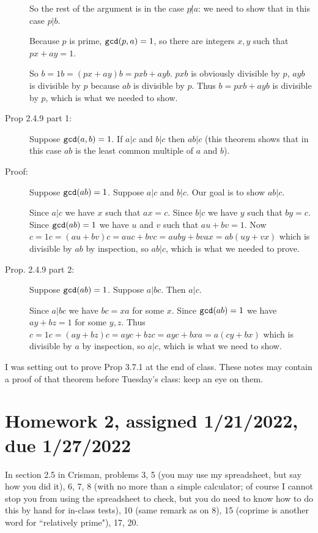 \documentclass[12pt]{article}
\begin{document}
\begin{description}
So the rest of the argument is in the case $p\not|a$:  we need to show that in this case $p|b$.

Because $p$ is prime, ${\tt gcd}(p,a)=1$, so there are integers $x,y$ such that $px+ay=1$.

So $b=1b=(px+ay)b = pxb + ayb$.  $pxb$ is obviously divisible by $p$,  $ayb$ is divisible by $p$ because $ab$ is divisible by $p$.
Thus $b=pxb +ayb$ is divisible by $p$, which is what we needed to show.

\item[Prop 2.4.9 part 1:]  Suppose ${\tt gcd}(a,b) = 1$.  If $a|c$ and $b|c$ then $ab|c$ (this theorem shows that in this case $ab$ is the least common multiple of $a$ and $b$).

\item[Proof:]  Suppose ${\tt gcd}(ab) = 1$.  Suppose $a|c$ and $b|c$.  Our goal is to show $ab|c$.

Since $a|c$ we have $x$ such that $ax=c$.  Since $b|c$ we have $y$ such that $by=c$.  Since ${\tt gcd}(ab) = 1$ we have $u$ and $v$ such that $au+bv=1$.  Now $c=1c=(au+bv)c=auc + bvc= auby + bvax = ab(uy+vx)$ which is divisible by $ab$ by inspection, so $ab|c$, which is what we needed to prove.

\item[Prop. 2.4.9 part 2:]  Suppose ${\tt gcd}(ab) = 1$.  Suppose $a|bc$.  Then $a|c$.

Since $a|bc$ we have $bc=xa$ for some $x$.  Since ${\tt gcd}(ab) = 1$ we have $ay+bz=1$ for some $y,z$.  Thus $c=1c = (ay+bz)c=ayc+bzc=ayc +bxa=a(cy+bx)$ which is divisible by $a$ by inspection, so $a|c$, which is what we need to show.

\end{description}

I was setting out to prove Prop 3.7.1 at the end of class.  These notes may contain a proof of that theorem before Tuesday's class:  keep an eye on them.

\newpage

\section{Homework 2, assigned 1/21/2022, due 1/27/2022}

In section 2.5 in Crisman, problems 3, 5 (you may use my spreadsheet, but say how you did it), 6, 7, 8 (with no more than a simple calculator;  of course I cannot stop you from using the spreadsheet to check, but you do need to know how to do this by hand for in-class tests), 10 (same remark as on 8), 15 (coprime is another word for ``relatively prime"), 17, 20.
\end{document}
